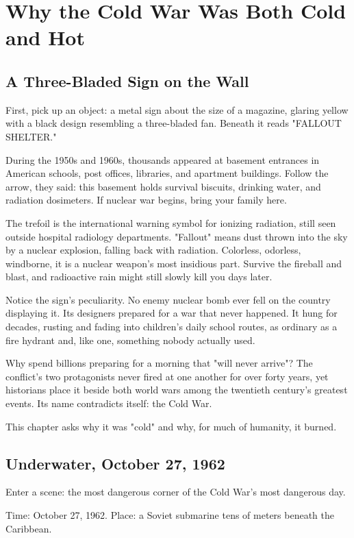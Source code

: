 \chapter[The Cold War: Cold and Hot]{Why the Cold War Was Both Cold and Hot}
\section{A Three-Bladed Sign on the Wall}
First, pick up an object: a metal sign about the size of a magazine, glaring yellow with a black design resembling a three-bladed fan. Beneath it reads "FALLOUT SHELTER."

During the 1950s and 1960s, thousands appeared at basement entrances in American schools, post offices, libraries, and apartment buildings. Follow the arrow, they said: this basement holds survival biscuits, drinking water, and radiation dosimeters. If nuclear war begins, bring your family here.

The trefoil is the international warning symbol for ionizing radiation, still seen outside hospital radiology departments. "Fallout" means dust thrown into the sky by a nuclear explosion, falling back with radiation. Colorless, odorless, windborne, it is a nuclear weapon's most insidious part. Survive the fireball and blast, and radioactive rain might still slowly kill you days later.

Notice the sign's peculiarity. No enemy nuclear bomb ever fell on the country displaying it. Its designers prepared for a war that never happened. It hung for decades, rusting and fading into children's daily school routes, as ordinary as a fire hydrant and, like one, something nobody actually used.

Why spend billions preparing for a morning that "will never arrive"? The conflict's two protagonists never fired at one another for over forty years, yet historians place it beside both world wars among the twentieth century's greatest events. Its name contradicts itself: the Cold War.

This chapter asks why it was "cold" and why, for much of humanity, it burned.

\section{Underwater, October 27, 1962}
Enter a scene: the most dangerous corner of the Cold War's most dangerous day.

Time: October 27, 1962. Place: a Soviet submarine tens of meters beneath the Caribbean.

